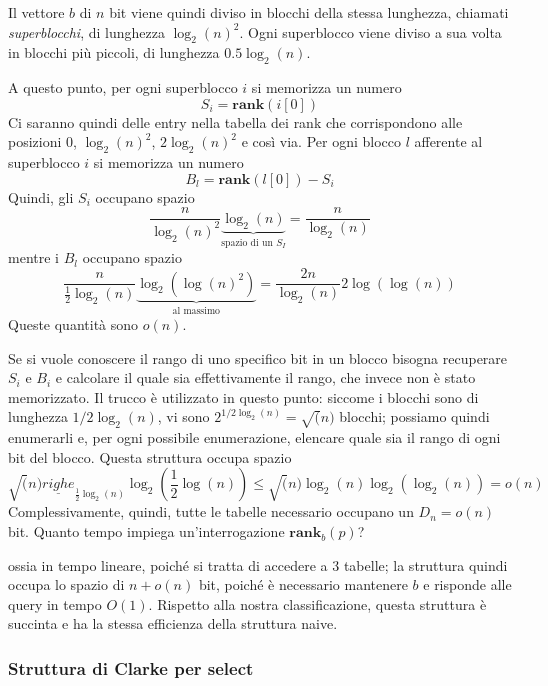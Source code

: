 \noindent
Il vettore $b$  di $n$ bit viene quindi diviso in blocchi della stessa lunghezza, chiamati
\textit{superblocchi}, di lunghezza $\log_2(n)^2$. Ogni superblocco viene
diviso a sua volta in blocchi più piccoli, di lunghezza $0.5 \log_2(n)$.

A questo punto, per ogni superblocco $i$ si memorizza un numero
$$
	S_i = \mathbf{rank}(i[0])
$$
Ci saranno quindi delle entry nella tabella dei rank che corrispondono alle
posizioni $0$, $\log_2(n)^2$, $2\log_2(n)^2$ e così via.
Per ogni blocco $l$ afferente al superblocco $i$ si memorizza un numero
$$
	B_l = \mathbf{rank}(l[0]) - S_i
$$
Quindi, gli $S_i$ occupano spazio
$$
	\frac{n}{\log_2(n)^2} \underbrace{\log_2(n)}_{\text{spazio di un } S_I} = \frac{n}{\log_2(n)}
$$
mentre i $B_l$ occupano spazio
$$
	\frac{n}{\frac{1}{2}\log_2(n)} \underbrace{\log_2(\log(n)^2)}_{\text{al massimo}} = \frac{2n}{\log_2(n)} 2 \log(\log(n))
$$
Queste quantità sono $o(n)$.

Se si vuole conoscere il rango di uno specifico bit in un blocco bisogna
recuperare $S_i$ e $B_i$ e calcolare il quale sia effettivamente il rango, che
invece non è stato memorizzato. Il trucco è utilizzato in questo punto:
siccome i blocchi sono di lunghezza $1/2 \log_2(n)$, vi sono
$2^{1/2 \log_2(n)} = \sqrt(n)$ blocchi; possiamo quindi enumerarli e,
per ogni possibile enumerazione, elencare quale sia il rango di ogni
bit del blocco.  Questa struttura occupa spazio
$$
	\sqrt(n) \underline{righe}_{\frac{1}{2} \log_2(n)} \log_2(\frac{1}{2}\log(n))
	\leq \sqrt(n) \log_2(n) \log_2(\log_2(n))  = o(n)
$$
Complessivamente, quindi, tutte le tabelle necessario occupano un $D_n = o(n)$ bit.
Quanto tempo impiega un'interrogazione $\mathbf{rank}_b(p)$?


ossia in tempo lineare, poiché si tratta di accedere a $3$ tabelle; la struttura
quindi occupa lo spazio di $n + o(n)$ bit, poiché è necessario mantenere $b$ e
risponde alle query in tempo $O(1)$. Rispetto alla nostra classificazione,
questa struttura è succinta e ha la stessa efficienza della struttura na\:ive.

\subsubsection{Struttura di Clarke per select}



